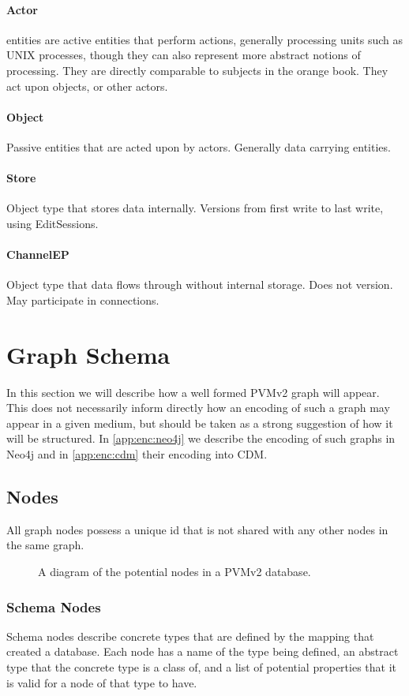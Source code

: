 \documentclass[12pt,twoside,a4paper]{article}
\newcommand{\para}[1]{\paragraph{#1\\}}
\begin{document}
\para{Actor}
\label{sec:ty:actor}
 entities are active entities that perform actions, generally processing units such as UNIX processes, though they can also represent more abstract notions of processing. They are directly comparable to subjects in the orange book. They act upon objects, or other actors.

\para{Object}
\label{sec:ty:object}
Passive entities that are acted upon by actors. Generally data carrying entities.

\para{Store}
\label{sec:ty:store}
Object type that stores data internally. Versions from first write to last write, using EditSessions.

\para{ChannelEP}
\label{sec:ty:chanep}
Object type that data flows through without internal storage. Does not version. May participate in connections.

\section{Graph Schema}
\label{sec:gs}
In this section we will describe how a well formed PVMv2 graph will appear. This does not necessarily inform directly how an encoding of such a graph may appear in a given medium, but should be taken as a strong suggestion of how it will be structured. In \autoref{app:enc:neo4j} we describe the encoding of such graphs in Neo4j and in \autoref{app:enc:cdm} their encoding into CDM.

\subsection{Nodes}
\label{sec:gs:node}
All graph nodes possess a unique id that is not shared with any other nodes in the same graph.

\begin{figure}[h]
\centering

\caption{A diagram of the potential nodes in a PVMv2 database.}
\label{fig:nodes}
\end{figure}

\subsubsection{Schema Nodes}
\label{sec:gs:node:schema}
Schema nodes describe concrete types that are defined by the mapping that created a database. Each node has a name of the type being defined, an abstract type that the concrete type is a class of, and a list of potential properties that it is valid for a node of that type to have.
\end{document}
